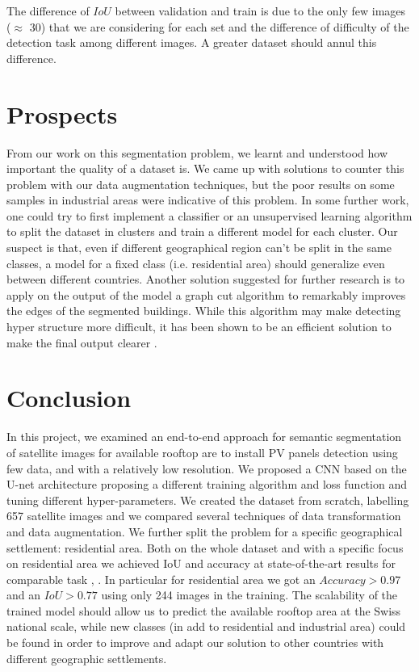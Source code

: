 \documentclass[9pt,conference,compsocconf]{IEEEtran}
\begin{document}
The difference of $IoU$ between validation and train is due to the only few images ($\approx$ 30) that we are considering for each set and the difference of difficulty of the detection task among different images. A greater dataset should annul this difference.

\section{Prospects}
From our work on this segmentation problem, we learnt and understood how important the quality of a dataset is. We came up with solutions to counter this problem with our data augmentation techniques, but the poor results on some samples in industrial areas were indicative of this problem. In some further work, one could try to first implement a classifier or an unsupervised learning algorithm to split the dataset in clusters and train a different model for each cluster. Our suspect is that, even if different geographical region can't be split in the same classes, a model for a fixed class (i.e. residential area) should generalize even between different countries.
Another solution suggested for further research is to apply on the output of the model a graph cut algorithm to remarkably improves the edges of the segmented buildings. While this algorithm may make detecting hyper structure more difficult, it has been shown to be an efficient solution to make the final output clearer \cite{rs9070701}.

\section{Conclusion}

In this project, we examined an end-to-end approach for semantic segmentation of satellite images for available rooftop are to install PV panels detection using few data, and with a relatively low resolution.
We proposed a CNN based on the U-net architecture proposing a different training  algorithm  and  loss  function  and  tuning  different  hyper-parameters.
We created the dataset from scratch, labelling 657 satellite images and we compared several techniques of data transformation and data augmentation. We further split the problem for a specific geographical settlement: residential area. Both on the whole dataset and with a specific focus on residential area we achieved IoU and accuracy at state-of-the-art results for comparable task \cite{castello2019deep}, \cite{chhor2017satellite}. In particular for residential area we got an $Accuracy >0.97$  and  an $IoU >0.77$  using  only  244  images  in  the  training. The scalability  of  the  trained  model  should  allow us  to  predict  the  available  rooftop  area  at  the  Swiss  national  scale,  while  new  classes  (in  add  to residential and industrial area) could be found in order to improve and adapt our solution to other countries with different geographic settlements.

\twocolumn[
\begin{@twocolumnfalse}
\nocite{*}


\end{@twocolumnfalse}
]
\end{document}
